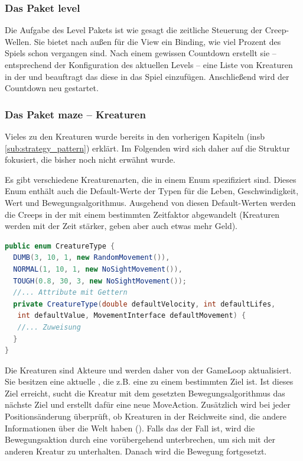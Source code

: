\subsubsection{Das Paket level} %

\label{ssub:level}

Die Aufgabe des Level Pakets ist wie gesagt die zeitliche Steuerung der Creep-Wellen. Sie bietet nach außen für die View ein Binding, wie viel Prozent des Spiels schon vergangen sind. Nach einem gewissen Countdown erstellt sie -- entsprechend der Konfiguration des aktuellen Levels -- eine Liste von Kreaturen in der  und beauftragt das  diese in das Spiel einzufügen. Anschließend wird der Countdown neu gestartet.


\subsubsection{Das Paket maze -- Kreaturen} %
\label{ssub:maze_kreaturen}
Vieles zu den Kreaturen wurde bereits in den vorherigen Kapiteln (insb \ref{sub:strategy_pattern}) erklärt. Im Folgenden wird sich daher auf die Struktur fokusiert, die bisher noch nicht erwähnt wurde.

Es gibt verschiedene Kreaturenarten, die in einem Enum  spezifiziert sind. Dieses Enum enthält auch die Default-Werte der Typen für die Leben, Geschwindigkeit, Wert und Bewegungsalgorithmus. Ausgehend von diesen Default-Werten werden die Creeps in der  mit einem bestimmten Zeitfaktor abgewandelt (Kreaturen werden mit der Zeit stärker, geben aber auch etwas mehr Geld).

\begin{lstlisting}[language=Java]
public enum CreatureType {
  DUMB(3, 10, 1, new RandomMovement()),
  NORMAL(1, 10, 1, new NoSightMovement()),
  TOUGH(0.8, 30, 3, new NoSightMovement());
  //... Attribute mit Gettern
  private CreatureType(double defaultVelocity, int defaultLifes,
   int defaultValue, MovementInterface defaultMovement) {
   //... Zuweisung
  }
}
\end{lstlisting}

Die Kreaturen sind Akteure und werden daher von der GameLoop aktualisiert. Sie besitzen eine aktuelle , die z.B. eine  zu einem bestimmten Ziel ist. Ist dieses Ziel erreicht, sucht die Kreatur mit dem gesetzten Bewegungsalgorithmus das nächste Ziel und erstellt dafür eine neue MoveAction. Zusätzlich wird bei jeder Positionsänderung überprüft, ob Kreaturen in der Reichweite sind, die andere Informationen über die Welt haben (). Falls das der Fall ist, wird die Bewegungsaktion durch eine  vorübergehend unterbrechen, um sich mit der anderen Kreatur zu unterhalten. Danach wird die Bewegung fortgesetzt.

